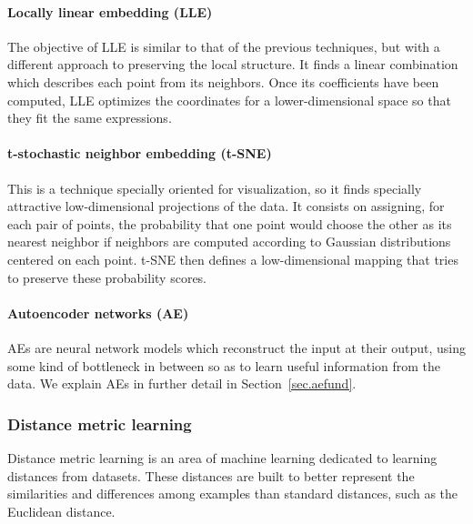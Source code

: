 \documentclass[
	fontsize=11pt, %
	twoside=false, %
	open=any, %
	secnumdepth=1, %
]{kaobook}
\newcommand{\change}[1]{{\color{blue}#1}}
\renewcommand{\change}[1]{#1}
\begin{document}
\paragraph*{Locally linear embedding (LLE) \cite{LLE}} The objective of LLE is similar to that of the previous techniques, but with a different approach to preserving the local structure. It finds a linear combination which describes \change{each point} from its neighbors. Once \change{its} coefficients have been computed, LLE optimizes the coordinates for a lower-dimensional space so that they fit the same expressions.

\paragraph*{t-stochastic neighbor embedding (t-SNE) \cite{van2008visualizing}} This is a technique specially oriented for visualization, so it finds specially attractive low-dimensional projections of the data. %
It consists on assigning, for each pair of points, the probability that one point would choose the other as its nearest neighbor if neighbors are computed according to Gaussian distributions centered on each point. t-SNE then defines a low-dimensional mapping that tries to preserve these probability scores.

\paragraph*{Autoencoder networks (AE) \cite{charte-tutorial}} AEs are neural network models which reconstruct the input at their output, using some kind of bottleneck in between so as to learn useful information from the data. We explain AEs in further detail in Section~\ref{sec.aefund}.


\subsubsection{Distance metric learning}

Distance metric learning \cite{suarez2018tutorial} is an area of machine learning dedicated to learning distances from datasets. These distances are built to better represent the similarities and differences among examples than standard distances, such as the Euclidean distance.
\end{document}
